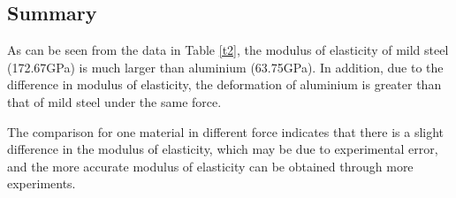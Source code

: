 \subsection*{Summary}

As can be seen from the data in Table \ref{t2}, 
the modulus of elasticity of mild steel (172.67GPa) is much larger than aluminium (63.75GPa).
In addition, due to the difference in modulus of elasticity, the deformation of aluminium is 
greater than that of mild steel under the same force.

The comparison for one material in different force indicates that there is a slight difference 
in the modulus of elasticity, 
which may be due to experimental error, and the more accurate 
modulus of elasticity can be obtained through more 
experiments.

\fi